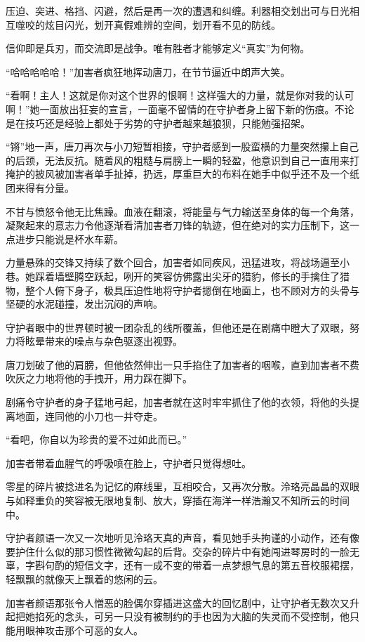 \documentclass[UTF8, scheme = chinese, openany]{ctexbook}
\begin{document}
压迫、突进、格挡、闪避，然后是再一次的遭遇和纠缠。利器相交划出可与日光相互噬咬的炫目闪光，划开真假难辨的空间，划开看不见的防线。

信仰即是兵刃，而交流即是战争。唯有胜者才能够定义“真实”为何物。

“哈哈哈哈哈！”加害者疯狂地挥动唐刀，在节节逼近中朗声大笑。

“看啊！主人！这就是你对这个世界的恨啊！这样强大的力量，就是你对我的认可啊！”她一面放出狂妄的宣言，一面毫不留情的在守护者身上留下新的伤痕。不论是在技巧还是经验上都处于劣势的守护者越来越狼狈，只能勉强招架。

“锵”地一声，唐刀再次与小刀短暂相接，守护者感到一股蛮横的力量突然攥上自己的后颈，无法反抗。随着风的粗糙与肩膀上一瞬的轻盈，他意识到自己一直用来打掩护的披风被加害者单手扯掉，扔远，厚重巨大的布料在她手中似乎还不及一个纸团来得有分量。

不甘与愤怒令他无比焦躁。血液在翻滚，将能量与气力输送至身体的每一个角落，凝聚起来的意志力令他逐渐看清加害者刀锋的轨迹，但在绝对的实力压制下，这一点进步只能说是杯水车薪。

力量悬殊的交锋又持续了数个回合，加害者如同疾风，迅猛进攻，将战场逼至小巷。她踩着墙壁腾空跃起，咧开的笑容仿佛露出尖牙的猎豹，修长的手擒住了猎物，整个人俯下身子，极具压迫性地将守护者摁倒在地面上，也不顾对方的头骨与坚硬的水泥碰撞，发出沉闷的声响。

守护者眼中的世界顿时被一团杂乱的线所覆盖，但他还是在剧痛中瞪大了双眼，努力将眩晕带来的噪点与杂色驱逐出视野。

唐刀划破了他的肩膀，但他依然伸出一只手掐住了加害者的咽喉，直到加害者不费吹灰之力地将他的手拽开，用力踩在脚下。

剧痛令守护者的身子猛地弓起，加害者就在这时牢牢抓住了他的衣领，将他的头提离地面，连同他的小刀也一并夺走。

“看吧，你自以为珍贵的爱不过如此而已。”

加害者带着血腥气的呼吸喷在脸上，守护者只觉得想吐。

零星的碎片被捻进名为记忆的麻线里，互相咬合，又再次分散。泠珞亮晶晶的双眼与如释重负的笑容被无限地复制、放大，穿插在海洋一样浩瀚又不知所云的时间中。

守护者颜语一次又一次地听见泠珞天真的声音，看见她手头拘谨的小动作，还有像要护住什么似的那习惯性微微勾起的后背。交杂的碎片中有她闯进琴房时的一脸无辜，字斟句酌的短信文字，还有一成不变的带着一点梦想气息的第五音校服裙摆，轻飘飘的就像天上飘着的悠闲的云。

加害者颜语那张令人憎恶的脸偶尔穿插进这盛大的回忆剧中，让守护者无数次又升起把她掐死的念头，可另一只没有被制约的手也因为大脑的失灵而不受控制，他只能用眼神攻击那个可恶的女人。
\end{document}
